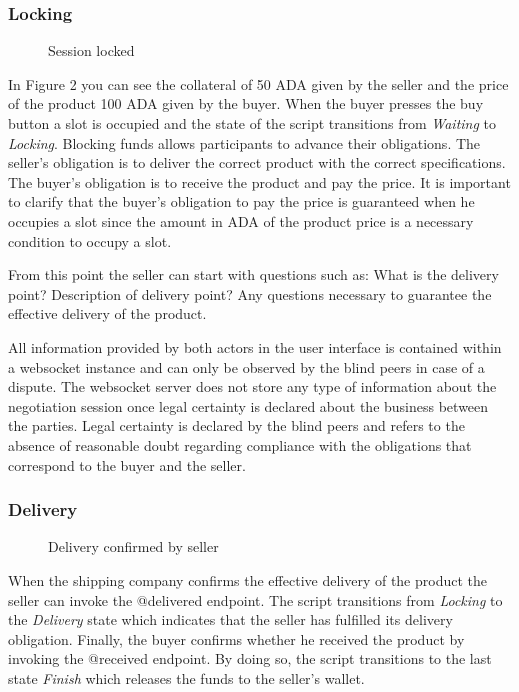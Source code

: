 \documentclass[12pt]{article}
\begin{document}
\subsubsection { Locking }

\begin{figure}[ht]
  \centering
  
  \caption{Session locked}
  \label{fig:locking}
\end{figure}


In Figure 2 you can see the collateral of 50 ADA given by the seller and the price of the product 100 ADA given by the buyer.
When the buyer presses the buy button a slot is occupied and the state of the script transitions from \emph{Waiting} to \emph{Locking}.
Blocking funds allows participants to advance their obligations.
The seller's obligation is to deliver the correct product with the correct specifications. The buyer's obligation is to receive the product and pay the price.
It is important to clarify that the buyer's obligation to pay the price is guaranteed when he occupies a slot since the amount in ADA of the product price is a necessary condition to occupy a slot.

From this point the seller can start with questions such as: What is the delivery point? Description of delivery point? Any questions necessary to guarantee the effective delivery of the product.

All information provided by both actors in the user interface is contained within a websocket instance and can only be observed by the blind peers in case of a dispute.
The websocket server does not store any type of information about the negotiation session once legal certainty is declared about the business between the parties.
Legal certainty is declared by the blind peers and refers to the absence of reasonable doubt regarding compliance with the obligations that correspond to the buyer and the seller.


\subsubsection { Delivery }


\begin{figure}[ht]
  \centering
  
  \caption{Delivery confirmed by seller}  
  \label{fig:delivered}
\end{figure}



When the shipping company confirms the effective delivery of the product the seller can invoke the @delivered endpoint.
The script transitions from \emph{Locking} to the \emph{Delivery} state which indicates that the seller has fulfilled its delivery obligation.
Finally, the buyer confirms whether he received the product by invoking the @received endpoint. By doing so, the script transitions to the last state \emph{Finish} which releases the funds to the seller's wallet.
\end{document}
